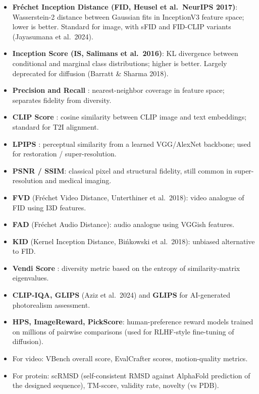 \documentclass{article}
\begin{document}
\begin{itemize}

\item
  \textbf{Fréchet Inception Distance (FID, Heusel et al.~NeurIPS 2017)}: Wasserstein-2 distance between Gaussian fits in InceptionV3 feature space; lower is better. Standard for image, with sFID and FID-CLIP variants (Jayasumana et al.~2024).
\item
  \textbf{Inception Score (IS, Salimans et al.~2016)}: KL divergence between conditional and marginal class distributions; higher is better. Largely deprecated for diffusion (Barratt \& Sharma 2018).
\item
  \textbf{Precision and Recall} \citep{kynknniemi2019improvedprecisiona}: nearest-neighbor coverage in feature space; separates fidelity from diversity.
\item
  \textbf{CLIP Score} \citep{hessel2021clipscoreareferenc}: cosine similarity between CLIP image and text embeddings; standard for T2I alignment.
\item
  \textbf{LPIPS} \citep{zhang2018theunreasonableeff}: perceptual similarity from a learned VGG/AlexNet backbone; used for restoration / super-resolution.
\item
  \textbf{PSNR / SSIM}: classical pixel and structural fidelity, still common in super-resolution and medical imaging.
\item
  \textbf{FVD} (Fréchet Video Distance, Unterthiner et al.~2018): video analogue of FID using I3D features.
\item
  \textbf{FAD} (Fréchet Audio Distance): audio analogue using VGGish features.
\item
  \textbf{KID} (Kernel Inception Distance, Bińkowski et al.~2018): unbiased alternative to FID.
\item
  \textbf{Vendi Score} \citep{friedman2022thevendiscoreadive}: diversity metric based on the entropy of similarity-matrix eigenvalues.
\item
  \textbf{CLIP-IQA, GLIPS} (Aziz et al.~2024) and \textbf{GLIPS} for AI-generated photorealism assessment.
\item
  \textbf{HPS, ImageReward, PickScore}: human-preference reward models trained on millions of pairwise comparisons (used for RLHF-style fine-tuning of diffusion).
\item
  For video: VBench overall score, EvalCrafter scores, motion-quality metrics.
\item
  For protein: scRMSD (self-consistent RMSD against AlphaFold prediction of the designed sequence), TM-score, validity rate, novelty (vs PDB).
\end{itemize}
\end{document}
